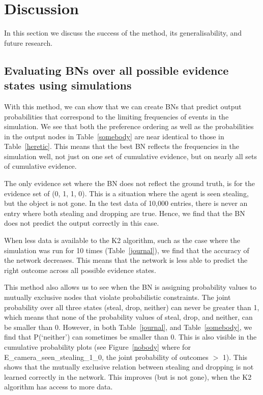 \documentclass[12pt]{article}
\begin{document}
\newpage



\section{Discussion}
In this section we discuss the success of the method, its generalisability, and future research.


\subsection{Evaluating BNs over all possible evidence states using simulations}
With this method, we can show that we can create BNs that predict output probabilities that correspond to the limiting frequencies of events in the simulation. We see that both the preference ordering as well as the probabilities in the output nodes in Table~\ref{somebody} are near identical to those in Table~\ref{heretic}. This means that the best BN reflects the frequencies in the simulation well, not just on one set of cumulative evidence, but on nearly all sets of cumulative evidence. 

The only evidence set where the BN does not reflect the ground truth, is for the evidence set of (0, 1, 1, 0). This is a situation where the agent is seen stealing, but the object is not gone. In the test data of 10,000 entries, there is never an entry where both stealing and dropping are true. Hence, we find that the BN does not predict the output correctly in this case. 

When less data is available to the K2 algorithm, such as the case where the simulation was run for 10 times (Table~\ref{journal}), we find that the accuracy of the network decreases. This means that the network is less able to predict the right outcome across all possible evidence states.

This method also allows us to see when the BN is assigning probability values to mutually exclusive nodes that violate probabilistic constraints. The joint probability over all three states (steal, drop, neither) can never be greater than 1, which means that none of the probability values of steal, drop, and neither, can be smaller than 0. However, in both Table~\ref{journal}, and Table~\ref{somebody}, we find that P(`neither') can sometimes be smaller than 0. This is also visible in the cumulative probability plots (see Figure~\ref{nobody} where for E\_camera\_seen\_stealing\_1\_0, the joint probability of outcomes $>$ 1). This shows that the mutually exclusive relation between stealing and dropping is not learned correctly in the network. This improves (but is not gone), when the K2 algorithm has access to more data.
\end{document}
